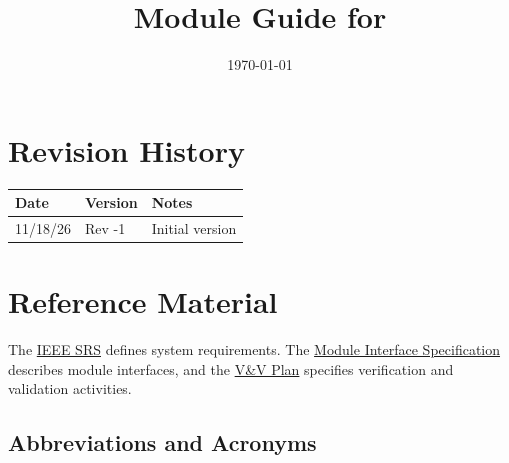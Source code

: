 \documentclass[12pt, titlepage]{article}
\begin{document}
\title{Module Guide for \progname{}} 
\author{\authname}
\date{\today}

\maketitle


\section{Revision History}

\begin{tabularx}{\textwidth}{p{3cm}p{2cm}X}
\toprule {\bf Date} & {\bf Version} & {\bf Notes}\\
\midrule
11/18/26 & Rev -1 & Initial version \\

\bottomrule
\end{tabularx}

\newpage

\section{Reference Material}

The \href{https://github.com/meena-alomran/game-n-grow/blob/main/pdfs/SRS-IEEE/SRS.pdf}{IEEE SRS} defines system requirements.
The \href{https://github.com/meena-alomran/game-n-grow/blob/main/pdfs/Design/SoftDetailedDes/MIS.pdf}{Module Interface Specification} describes
module interfaces, and the \href{https://github.com/meena-alomran/game-n-grow/blob/main/pdfs/VnVPlan/VnVPlan.pdf}{V\&V Plan} specifies
verification and validation activities.

\subsection{Abbreviations and Acronyms}
\end{document}
